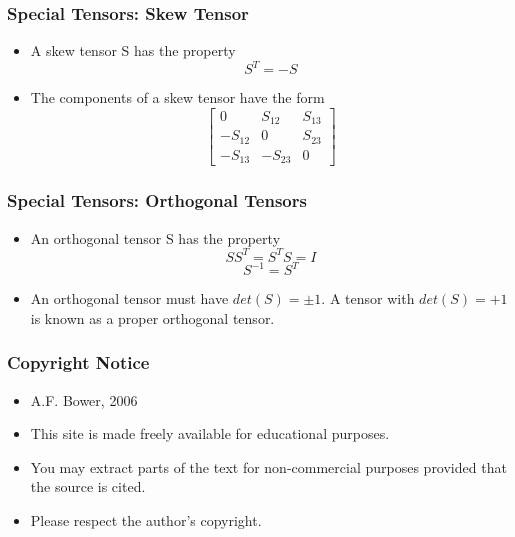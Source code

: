 \documentclass{beamer}
\begin{document}
\begin{frame}
\frametitle{Special Tensors: Skew Tensor}
\begin{itemize}
    \item A skew tensor S has the property
    \[
    S^T = -S
    \]
    \item The components of a skew tensor have the form
    \[
    \begin{bmatrix}
        0 & S_{12} & S_{13} \\
        -S_{12} & 0 & S_{23} \\
        -S_{13} & -S_{23} & 0
    \end{bmatrix}
    \]
\end{itemize}
\end{frame}

\begin{frame}
\frametitle{Special Tensors: Orthogonal Tensors}
\begin{itemize}
    \item An orthogonal tensor S has the property
    \[
    S S^T = S^T S = I
    \]
    \[
    S^{-1} = S^T
    \]
    \item An orthogonal tensor must have \(det(S) = \pm 1\). A tensor with \(det(S) = +1\) is known as a proper orthogonal tensor.
\end{itemize}
\end{frame}

\begin{frame}
\frametitle{Copyright Notice}
\begin{itemize}
    \item A.F. Bower, 2006
    \item This site is made freely available for educational purposes.
    \item You may extract parts of the text for non-commercial purposes provided that the source is cited.
    \item Please respect the author's copyright.
\end{itemize}
\end{frame}
\end{document}
